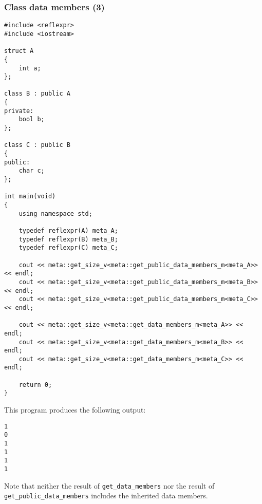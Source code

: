 \subsubsection{Class data members (3)}

\begin{verbatim}
#include <reflexpr>
#include <iostream>

struct A
{
	int a;
};

class B : public A
{
private:
	bool b;
};

class C : public B
{
public:
	char c;
};

int main(void)
{
	using namespace std;

	typedef reflexpr(A) meta_A;
	typedef reflexpr(B) meta_B;
	typedef reflexpr(C) meta_C;

	cout << meta::get_size_v<meta::get_public_data_members_m<meta_A>> << endl;
	cout << meta::get_size_v<meta::get_public_data_members_m<meta_B>> << endl;
	cout << meta::get_size_v<meta::get_public_data_members_m<meta_C>> << endl;

	cout << meta::get_size_v<meta::get_data_members_m<meta_A>> << endl;
	cout << meta::get_size_v<meta::get_data_members_m<meta_B>> << endl;
	cout << meta::get_size_v<meta::get_data_members_m<meta_C>> << endl;

	return 0;
}
\end{verbatim}

This program produces the following output:

\begin{verbatim}
1
0
1
1
1
1
\end{verbatim}

Note that neither the result of \texttt{get\_data\_members} nor the result of
\texttt{get\_public\_data\_members} includes the inherited data members.
